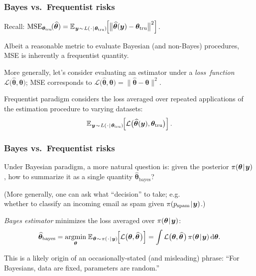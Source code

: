 \documentclass[18pt]{beamer}
\newcommand{\defineTightSpacing}{%
	\setlength{\abovedisplayskip}{.25\baselineskip}%
	\setlength{\belowdisplayskip}{.25\baselineskip}%
}
\renewcommand{\textsc}[1]{{\small \MakeUppercase{#1}}}
\newcommand{\given}{\thinnerspace | \thinnerspace}
\newcommand{\diff}{\operatorname{\mathrm{d}}\!{}}
\DeclareMathOperator*{\argmin}{argmin}
\newcommand{\thinnerspace}{\mskip.5\thinmuskip}
\newcommand{\expectation}{\mathbb{E}}
\newcommand{\truthSub}{\mathrm{tru}}
\newcommand{\density}{\operatorname{\pi}}
\newcommand{\likelihood}{L}
\newcommand{\by}{\bm{y}}
\newcommand{\btheta}{\bm{\theta}}
\newcommand{\loss}{\mathcal{L}}
\begin{document}
\begin{frame}
\frametitle{Bayes vs.\ Frequentist risks}
Recall: 
$\displaystyle 
\operatorname{MSE}_{\btheta_\truthSub\!}(\widehat{\btheta})
	= \expectation_{\thinnerspace \by \thinnerspace \sim \thinnerspace  \likelihood(\thinnerspace \cdot \given \btheta_\truthSub)\!}\!\left[
		\big\| \widehat{\btheta}(\by) - \btheta_\truthSub \big\|^2
	\right]$.
	
\pause
\smallskip
Albeit a reasonable metric to evaluate Bayesian (and non-Bayes) procedures, \textsc{MSE} is inherently a frequentist quantity. 

\pause
\smallskip
More generally, let's consider evaluating an estimator under a \textit{loss~function} $\loss\big(\widehat{\btheta}, \btheta\big)$; \textsc{MSE} corresponds to $\loss\big(\widehat{\btheta}, \btheta\big) = \| \widehat{\btheta} - \btheta \|^2$.

\pause
\smallskip
Frequentist paradigm considers the loss averaged over repeated applications of the estimation procedure to varying datasets: %
\begin{equation*} \defineTightSpacing%
\expectation_{\thinnerspace \by \thinnerspace \sim \thinnerspace  \likelihood(\thinnerspace \cdot \given \btheta_\truthSub)\!}\!\left[
		\loss\big(\widehat{\btheta}(\by), \btheta_\truthSub \big)
	\right].
\end{equation*}
\end{frame}


\begin{frame}
\frametitle{Bayes vs.\ Frequentist risks}
Under Bayesian paradigm, a more natural question is: given the posterior $\density(\btheta \given \by)$, how to summarize it as a single quantity $\widehat{\btheta}_{\textrm{bayes}}$?

\pause
(More generally, one can ask what ``decision'' to take; e.g.\ \\
\hphantom{(}whether to classify an incoming email as spam given $\density(p_\mathrm{spam} \given \by)$.)

\pause
\smallskip
\textit{Bayes estimator} minimizes the loss averaged over $\density(\btheta \given \by)$:
\begin{equation*} \defineTightSpacing%
\widehat{\btheta}_{\textrm{bayes}} =
	\argmin_{\btheta} \thinnerspace \expectation_{\thinnerspace \btheta \thinnerspace \sim \thinnerspace \density(\thinnerspace \cdot \given \by)\!}\!\left[
		\loss\big(\btheta, \widehat{\btheta} \thinnerspace \big)
	\right]
	= \int \loss\big(\btheta, \widehat{\btheta} \thinnerspace \big) \density(\btheta \given \by) \diff \btheta.
\end{equation*}

\pause
\smallskip
This is a likely origin of an occasionally-stated (and misleading) phrase: 
``For Bayesians, data are fixed, parameters are random.'' 
\end{frame}
\end{document}
